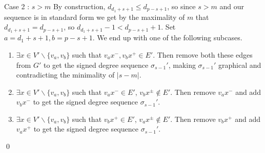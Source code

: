 \begin{frame}{Case 2 : $s > m$}
	By construction, $d_{d_1+s+1} \leq d_{p-s+1}$, so since $s > m$ and our sequence is in standard form we get by the maximality of $m$ that $d_{d_1+s+1} = d_{p-s+1}$, so $d_{d_1+s+1}-1 < d_{p-s+1}+1$. Set $a = d_1+s+1, b = p-s+1$. We end up with one of the following subcases.
	\begin{enumerate}
		\item $\exists x \in V'\backslash\{v_a,v_b\}$ such that $v_ax^{-}, v_bx^{+} \in E'$. Then remove both these edges from $G'$ to get the signed degree sequence $\sigma_{s-1}'$, making $\sigma_{s-1}'$ graphical and contradicting the minimality of $|s - m|$.
		\item $\exists x \in V'\backslash\{v_a,v_b\}$ such that $v_ax^{-} \in E'$, $v_bx^{\pm} \notin E'$. Then remove $v_ax^{-}$ and add $v_bx^{-}$ to get the signed degree sequence $\sigma_{s-1}'$.
		\item $\exists x \in V'\backslash\{v_a,v_b\}$ such that $v_bx^{+} \in E'$, $v_ax^{\pm} \notin E'$. Then remove $v_bx^{+}$ and add $v_ax^{+}$ to get the signed degree sequence $\sigma_{s-1}'$.
	\end{enumerate}  \qed
\end{frame}
